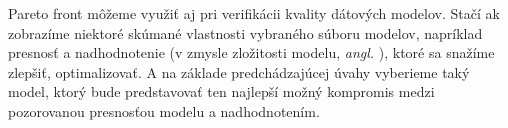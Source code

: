 Pareto front môžeme využiť aj pri verifikácii kvality dátových modelov. Stačí ak zobrazíme niektoré skúmané vlastnosti vybraného súboru modelov, napríklad presnosť a
nadhodnotenie (v zmysle zložitosti modelu, \textit{angl. }), ktoré sa snažíme zlepšiť, optimalizovať. A na základe predchádzajúcej úvahy vyberieme taký model, ktorý bude predstavovať ten najlepší možný kompromis medzi pozorovanou presnosťou modelu a nadhodnotením.
